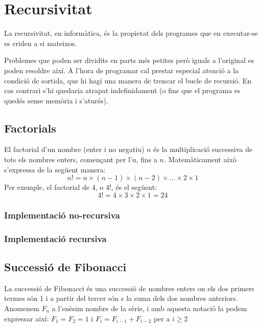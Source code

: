 \chapter{Recursivitat}

La recursivitat, en informàtica, és la propietat dels programes que en executar-se es criden a si mateixos.

Problemes que poden ser dividits en parts més petites però iguals a l'original es poden resoldre així.
A l'hora de programar cal prestar especial atenció a la condició de sortida, que hi hagi una manera de trencar el bucle de recursió. En cas contrari s'hi quedaria atrapat indefinidament (o fins que el programa es quedés sense memòria i s'aturés).

\section{Factorials}
El factorial d'un nombre (enter i no negatiu) $n$ és la multiplicació successiva de tots els nombres enters, començant per l'u, fins a $n$.
Matemàticament això s'expressa de la següent manera:
\begin{equation*}
	n! = n \times (n-1) \times (n-2) \times \ldots \times 2 \times 1 
\end{equation*}
Per exemple, el factorial de 4, o $4!$, és el següent:
\begin{equation*}
	4! = 4 \times 3 \times 2 \times 1 = 24 
\end{equation*}

\subsection{Implementació no-recursiva}

\vspace{1em}

\subsection{Implementació recursiva}

\vspace{1em}

\section{Successió de Fibonacci}
La successió de Fibonacci és una successió de nombres enters on els dos primers termes són 1 i a partir del tercer són s la suma dels dos nombres anteriors.
Anomenem $F_n$ a l'enèsim nombre de la sèrie, i amb aquesta notació la podem expressar així: $F_1=F_2=1$ i $F_i=F_{i-1}+F_{i-2}$ per a $i \geq 2$

